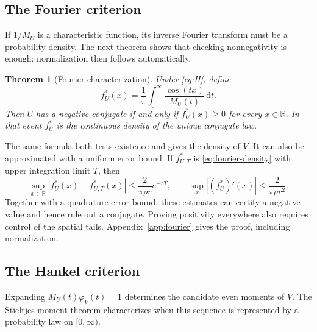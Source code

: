 \documentclass[11pt,twoside]{article}
\theoremstyle{journalplain}
\numberwithin{equation}{section}
\newtheorem{theorem}{Theorem}[section]
\theoremstyle{journaldefinition}
\newcommand{\R}{\mathbb R}
\newcommand{\dd}{\,\mathrm d}
\begin{document}
\subsection{The Fourier criterion}
If $1/M_U$ is a characteristic function, its inverse Fourier transform must be a probability density. The next theorem shows that checking nonnegativity is enough: normalization then follows automatically.
\begin{theorem}[Fourier characterization]\label{thm:fourier}
Under \eqref{eq:H}, define
\begin{equation}\label{eq:fourier-density}
 f_U^*(x)=\frac1\pi\int_0^\infty\frac{\cos(tx)}{M_U(t)}\dd t.
\end{equation}
Then $U$ has a negative conjugate if and only if $f_U^*(x)\ge0$ for every $x\in\R$. In that event $f_U^*$ is the continuous density of the unique conjugate law.
\end{theorem}
The same formula both tests existence and gives the density of $V$. It can also be approximated with a uniform error bound. If $f_{U,T}^*$ is \eqref{eq:fourier-density} with upper integration limit $T$, then
\begin{equation}\label{eq:fourier-error}
 \sup_{x\in\R}|f_U^*(x)-f_{U,T}^*(x)|
 \le\frac{2}{\pi\rho r}e^{-rT},\qquad
 \sup_x |(f_U^*)'(x)|\le\frac{2}{\pi\rho r^2}.
\end{equation}
Together with a quadrature error bound, these estimates can certify a negative value and hence rule out a conjugate. Proving positivity everywhere also requires control of the spatial tails. Appendix~\ref{app:fourier} gives the proof, including normalization.

\subsection{The Hankel criterion}
Expanding $M_U(t)\varphi_V(t)=1$ determines the candidate even moments of $V$. The Stieltjes moment theorem characterizes when this sequence is represented by a probability law on $[0,\infty)$.
\end{document}
